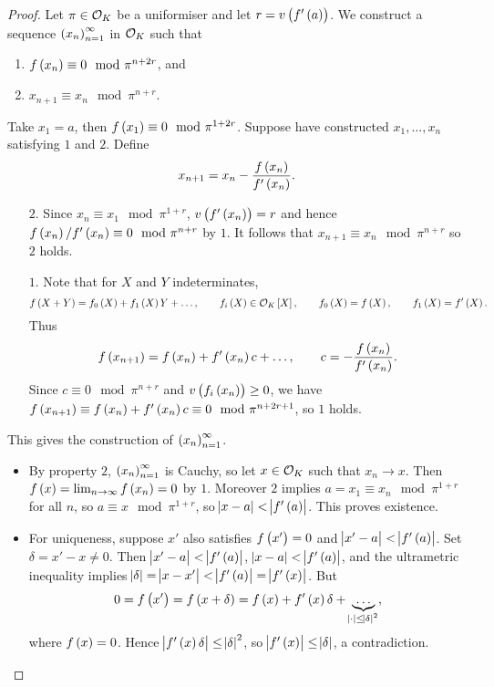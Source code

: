 \begin{proof}
Let $ \pi \in \mathcal{O}_K $ be a uniformiser and let $ r = v\br{f'\br{a}} $. We construct a sequence $ \br{x_n}_{n = 1}^\infty $ in $ \mathcal{O}_K $ such that
\begin{enumerate}
\item $ f\br{x_n} \equiv 0 \mod \pi^{n + 2r} $, and
\item $ x_{n + 1} \equiv x_n \mod \pi^{n + r} $.
\end{enumerate}
Take $ x_1 = a $, then $ f\br{x_1} \equiv 0 \mod \pi^{1 + 2r} $. Suppose have constructed $ x_1, \dots, x_n $ satisfying $ 1 $ and $ 2 $. Define
$$ x_{n + 1} = x_n - \dfrac{f\br{x_n}}{f'\br{x_n}}. $$
\begin{itemize}
\item[$ 2 $.] Since $ x_n \equiv x_1 \mod \pi^{1 + r} $, $ v\br{f'\br{x_n}} = r $ and hence $ f\br{x_n} / f'\br{x_n} \equiv 0 \mod \pi^{n + r} $ by $ 1 $. It follows that $ x_{n + 1} \equiv x_n \mod \pi^{n + r} $ so $ 2 $ holds.
\item[$ 1 $.] Note that for $ X $ and $ Y $ indeterminates,
$$ f\br{X + Y} = f_0\br{X} + f_1\br{X}Y + \dots, \qquad f_i\br{X} \in \OOO_K\sbr{X}, \qquad f_0\br{X} = f\br{X}, \qquad f_1\br{X} = f'\br{X}. $$
Thus
$$ f\br{x_{n + 1}} = f\br{x_n} + f'\br{x_n}c + \dots, \qquad c = -\dfrac{f\br{x_n}}{f'\br{x_n}}. $$
Since $ c \equiv 0 \mod \pi^{n + r} $ and $ v\br{f_i\br{x_n}} \ge 0 $, we have $ f\br{x_{n + 1}} \equiv f\br{x_n} + f'\br{x_n}c \equiv 0 \mod \pi^{n + 2r + 1} $, so $ 1 $ holds.
\end{itemize}
This gives the construction of $ \br{x_n}_{n = 1}^\infty $.
\begin{itemize}
\item By property $ 2 $, $ \br{x_n}_{n = 1}^\infty $ is Cauchy, so let $ x \in \mathcal{O}_K $ such that $ x_n \to x $. Then $ f\br{x} = \lim_{n \to \infty} f\br{x_n} = 0 $ by $ 1 $. Moreover $ 2 $ implies $ a = x_1 \equiv x_n \mod \pi^{1 + r} $ for all $ n $, so $ a \equiv x \mod \pi^{1 + r} $, so $ \abs{x - a} < \abs{f'\br{a}} $. This proves existence.
\item For uniqueness, suppose $ x' $ also satisfies $ f\br{x'} = 0 $ and $ \abs{x' - a} < \abs{f'\br{a}} $. Set $ \delta = x' - x \ne 0 $. Then $ \abs{x' - a} < \abs{f'\br{a}} $, $ \abs{x - a} < \abs{f'\br{a}} $, and the ultrametric inequality implies $ \abs{\delta} = \abs{x - x'} < \abs{f'\br{a}} = \abs{f'\br{x}} $. But
$$ 0 = f\br{x'} = f\br{x + \delta} = f\br{x} + f'\br{x}\delta + \underbrace{\dots}_{\abs{\cdot} \le \abs{\delta}^2}, $$
where $ f\br{x} = 0 $. Hence $ \abs{f'\br{x}\delta} \le \abs{\delta}^2 $, so $ \abs{f'\br{x}} \le \abs{\delta} $, a contradiction.
\end{itemize}
\end{proof}


